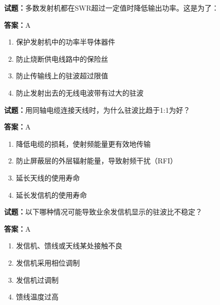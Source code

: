 \documentclass{ctexbook}
\begin{document}




\vspace{1em}

\textbf{试题：}多数发射机都在SWR超过一定值时降低输出功率。这是为了： 

\textbf{答案：}A 

\begin{enumerate}[leftmargin=3em]
  \item 保护发射机中的功率半导体器件 

  \item 防止烧断供电线路中的保险丝 

  \item 防止传输线上的驻波超过限值 

  \item 防止发射出去的无线电波带有过大的驻波 

\end{enumerate}





\vspace{1em}

\textbf{试题：}用同轴电缆连接天线时，为什么驻波比趋于1:1为好？ 

\textbf{答案：}A 

\begin{enumerate}[leftmargin=3em]
  \item 降低电缆的损耗，使射频能量更有效地传输 

  \item 防止屏蔽层的外层辐射能量，导致射频干扰（RFI） 

  \item 延长天线的使用寿命 

  \item 延长发信机的使用寿命 

\end{enumerate}





\vspace{1em}

\textbf{试题：}以下哪种情况可能导致业余发信机显示的驻波比不稳定？ 


\textbf{答案：}A 

\begin{enumerate}[leftmargin=3em]
  \item 发信机、馈线或天线某处接触不良 

  \item 发信机采用相位调制 

  \item 发信机过调制 

  \item 馈线温度过高 

\end{enumerate}
\end{document}
